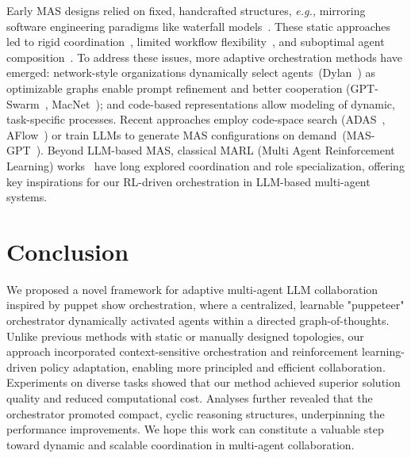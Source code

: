 \documentclass{article}
\newcommand{\eg}{\textit{e.g., }}
\begin{document}
Early MAS designs relied on fixed, handcrafted structures, \eg mirroring software engineering paradigms like waterfall models~\cite{park2023generative, chen2023agentverse, qian2024chatdevcommunicativeagentssoftware}. These static approaches led to rigid coordination~\cite{zhuge2024languageagentsoptimizablegraphs, qian2025scaling}, limited workflow flexibility~\cite{hu2025automateddesignagenticsystems, zhang2025aflowautomatingagenticworkflow}, and suboptimal agent composition~\cite{deshpande-etal-2023-toxicity, park2023generative, long-etal-2024-multi-expert, liu2024bolaa}.  
To address these issues, more adaptive orchestration methods have emerged: network-style organizations dynamically select agents~(Dylan~\cite{liu2024dynamicllmpoweredagentnetwork}) as optimizable graphs enable prompt refinement and better cooperation (GPT-Swarm~\cite{zhuge2024languageagentsoptimizablegraphs}, MacNet~\cite{qian2025scaling}); and code-based representations allow modeling of dynamic, task-specific processes. Recent approaches employ code-space search (ADAS~\cite{hu2025automateddesignagenticsystems}, AFlow~\cite{zhang2025aflowautomatingagenticworkflow}) or train LLMs to generate MAS configurations on demand~(MAS-GPT~\cite{ye2025masgpttrainingllmsbuild}).
Beyond LLM-based MAS, classical MARL (Multi Agent Reinforcement Learning) works~\cite{NEURIPS2022_2f279645,wang2021rode,liu2021coachplayermultiagentreinforcementlearning, vezhnevets2020optionsresponsesgroundingbehavioural} have long explored coordination and role specialization, offering key inspirations for our RL-driven orchestration in LLM-based multi-agent systems.

\section{Conclusion}
We proposed a novel framework for adaptive multi-agent LLM collaboration inspired by puppet show orchestration, where a centralized, learnable "puppeteer" orchestrator dynamically activated agents within a directed graph-of-thoughts. Unlike previous methods with static or manually designed topologies, our approach incorporated context-sensitive orchestration and reinforcement learning-driven policy adaptation, enabling more principled and efficient collaboration. Experiments on diverse tasks showed that our method achieved superior solution quality and reduced computational cost. Analyses further revealed that the orchestrator promoted compact, cyclic reasoning structures, underpinning the performance improvements. 
We hope this work can constitute a valuable step toward dynamic and scalable coordination in multi-agent collaboration.
\end{document}
